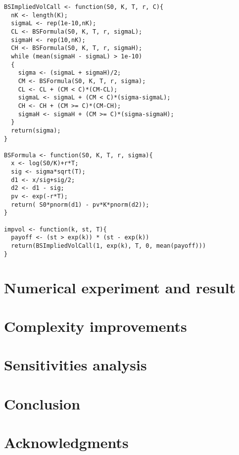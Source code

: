 \documentclass[12pt]{article}
\numberwithin{equation}{section}
\begin{document}
      \begin{lstlisting}
BSImpliedVolCall <- function(S0, K, T, r, C){
  nK <- length(K);
  sigmaL <- rep(1e-10,nK);
  CL <- BSFormula(S0, K, T, r, sigmaL);
  sigmaH <- rep(10,nK);
  CH <- BSFormula(S0, K, T, r, sigmaH);
  while (mean(sigmaH - sigmaL) > 1e-10)
  {
    sigma <- (sigmaL + sigmaH)/2;
    CM <- BSFormula(S0, K, T, r, sigma);
    CL <- CL + (CM < C)*(CM-CL);
    sigmaL <- sigmaL + (CM < C)*(sigma-sigmaL);
    CH <- CH + (CM >= C)*(CM-CH);
    sigmaH <- sigmaH + (CM >= C)*(sigma-sigmaH);
  }
  return(sigma);
}

BSFormula <- function(S0, K, T, r, sigma){
  x <- log(S0/K)+r*T;
  sig <- sigma*sqrt(T);
  d1 <- x/sig+sig/2;
  d2 <- d1 - sig;
  pv <- exp(-r*T);
  return( S0*pnorm(d1) - pv*K*pnorm(d2));
}
      
impvol <- function(k, st, T){
  payoff <- (st > exp(k)) * (st - exp(k))
  return(BSImpliedVolCall(1, exp(k), T, 0, mean(payoff)))
}
      \end{lstlisting}
            
\section{Numerical experiment and result}

\section{Complexity improvements}

\section{Sensitivities analysis}


\section{Conclusion}



\section*{Acknowledgments}
\end{document}
